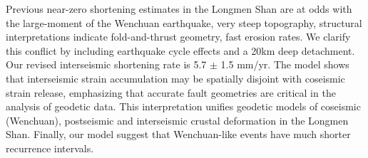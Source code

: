 \documentclass[12pt]{article}
\begin{document}
Previous near-zero shortening estimates in the Longmen Shan are at odds with the large-moment of the Wenchuan earthquake, very steep topography, structural interpretations indicate fold-and-thrust geometry, fast erosion rates. We clarify this conflict by including earthquake cycle effects and a 20km deep detachment. Our revised interseismic shortening rate is 5.7 $\pm$ 1.5 mm/yr. The model shows that interseismic strain accumulation may be spatially disjoint with coseismic strain release, emphasizing that accurate fault geometries are critical in the analysis of geodetic data. This interpretation unifies geodetic models of coseismic (Wenchuan), postseismic and interseismic crustal deformation in the Longmen Shan. Finally, our model suggest that Wenchuan-like events have much shorter recurrence intervals.



\end{document}
